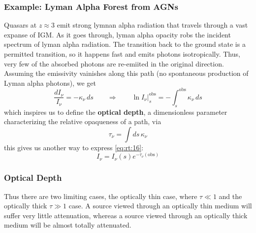 \documentclass[10pt]{article}
\numberwithin{equation}{section}
\begin{document}
\subsubsection{Example: Lyman Alpha Forest from AGNs} %
\label{ssub:example_lyman_alpha_forest_from_agns}
Quasars at $z\approx 3$ emit strong lymnan alpha radiation that travels through
a vast expanse of IGM. As it goes through, lyman alpha opacity robs the
incident spectrum of lyman alpha radiation. The transition back to the ground
state is a permitted transition, so it happens fast and emits photons
isotropically. Thus, very few of the absorbed photons are re-emiited in the
original direction. Assuming the emissivity vainishes along this path (no
spontaneous production of Lyman alpha photons), we get
\begin{equation}
  \label{eq:rt:16} \frac{dI_\nu}{I_\nu} = -\kappa_\nu\,ds \qquad \Rightarrow
  \qquad \left. \ln I_\nu\right\vert_s^{\mathrm{obs}} =
  -\int_s^{\mathrm{obs}}\kappa_\nu\,ds
\end{equation}
which inspires us to define the \textbf{optical depth}, a dimensionless
parameter characterizing the relative opaqueness of a path, via
\begin{equation}
  \label{eq:rt:17} \tau_\nu = \int ds\, \kappa_\nu
\end{equation}
this gives us another way to express \eqref{eq:rt:16}:
\begin{equation}
  \label{eq:rt:18} I_\nu = I_\nu(s) e^{-\tau_\nu(\mathrm{obs})}
\end{equation}
\subsubsection{Optical Depth} %
\label{ssub:optical_depth}
Thus there are two limiting cases, the optically thin case, where $\tau \ll 1$
and the optically thick $\tau \gg 1$ case. A source viewed through an optically
thin medium will suffer very little attenuation, whereas a source viewed
through an optically thick medium will be almost totally attenuated.\\
\end{document}
